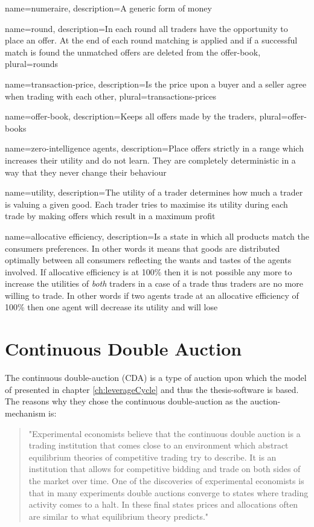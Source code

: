 \documentclass[../Bachelorarbeit.tex]{subfiles}
\begin{document}
 {
	name=numeraire,
	description={A generic form of money}
}

 {
	name=round,
	description={In each round all traders have the opportunity to place an offer. At the end of each round matching is applied and if a successful match is found the unmatched offers are deleted from the offer-book},
	plural=rounds
}

 {
	name=transaction-price,
	description={Is the price upon a buyer and a seller agree when trading with each other},
	plural=transactions-prices
}

 {
	name=offer-book,
	description={Keeps all offers made by the traders},
	plural=offer-books
}

 {
	name=zero-intelligence agents,
	description={Place offers strictly in a range which increases their utility and do not learn. They are completely deterministic in a way that they never change their behaviour}
}

 {
	name=utility,
	description={The utility of a trader determines how much a trader is valuing a given good. Each trader tries to maximise its utility during each trade by making offers which result in a maximum profit}
}

 {
	name=allocative efficiency,
	description={Is a state in which all products match the consumers preferences. In other words it means that goods are distributed optimally between all consumers reflecting the wants and tastes of the agents involved. If allocative efficiency is at 100\% then it is not possible any more to increase the utilities of \textit{both} traders in a case of a trade thus traders are no more willing to trade. In other words if two agents trade at an allocative efficiency of 100\% then one agent will decrease its utility and will lose}
}

\section{Continuous Double Auction}	
The continuous double-auction (CDA) is a type of auction upon which the model of \cite{Breuer2015} presented in chapter \ref{ch:leverageCycle} and thus the thesis-software is based. The reasons why they chose the continuous double-auction as the auction-mechanism is:

\begin{quote}
"Experimental economists believe that the continuous double auction is a trading institution that comes close to an environment which abstract equilibrium theories of competitive trading try to describe. It is an institution that allows for competitive bidding and trade on both sides of the market over time. One of the discoveries of experimental economists is that in many experiments double auctions converge to states where trading activity comes to a halt. In these final states prices and allocations often are similar to what equilibrium theory predicts." \cite{Breuer2015}
\end{quote}
\end{document}

